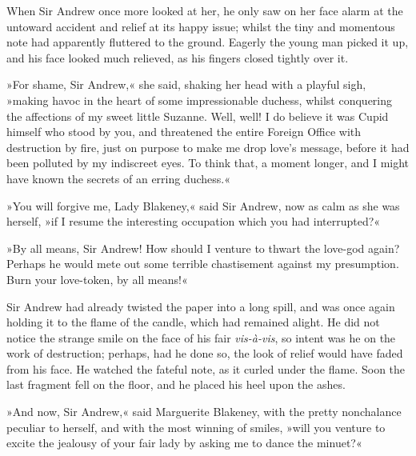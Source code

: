 When Sir Andrew once more looked at her, he only saw on her face alarm at the untoward accident and relief at its happy issue; whilst the tiny and momentous note had apparently fluttered to the ground. Eagerly the young man picked it up, and his face looked much relieved, as his fingers closed tightly over it.

»For shame, Sir Andrew,« she said, shaking her head with a playful sigh, »making havoc in the heart of some impressionable duchess, whilst conquering the affections of my sweet little Suzanne. Well, well! I do believe it was Cupid himself who stood by you, and threatened the entire Foreign Office with destruction by fire, just on purpose to make me drop love's message, before it had been polluted by my indiscreet eyes. To think that, a moment longer, and I might have known the secrets of an erring duchess.«

»You will forgive me, Lady Blakeney,« said Sir Andrew, now as calm as she was herself, »if I resume the interesting occupation which you had interrupted?«

»By all means, Sir Andrew! How should I venture to thwart the love-god again? Perhaps he would mete out some terrible chastisement against my presumption. Burn your love-token, by all means!«

Sir Andrew had already twisted the paper into a long spill, and was once again holding it to the flame of the candle, which had remained alight. He did not notice the strange smile on the face of his fair \textit{vis-à-vis}, so intent was he on the work of destruction; perhaps, had he done so, the look of relief would have faded from his face. He watched the fateful note, as it curled under the flame. Soon the last fragment fell on the floor, and he placed his heel upon the ashes.

»And now, Sir Andrew,« said Marguerite Blakeney, with the pretty nonchalance peculiar to herself, and with the most winning of smiles, »will you venture to excite the jealousy of your fair lady by asking me to dance the minuet?«